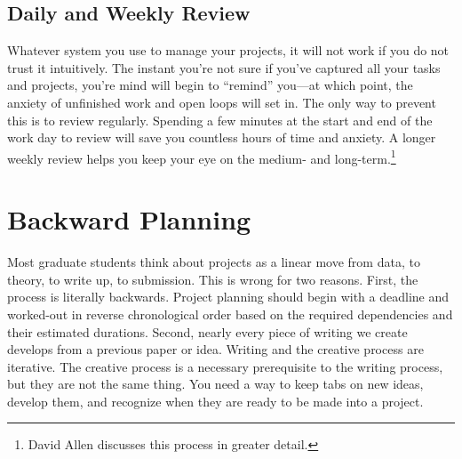 \documentclass{tufte-handout}
\begin{document}
\subsection{Daily and Weekly Review}
\label{sec:review}

Whatever system you use to manage your projects, it will not work if
you do not trust it intuitively. The instant you're not sure if you've
captured all your tasks and projects, you're mind will begin to
``remind'' you---at which point, the anxiety of unfinished work and
open loops will set in. The only way to prevent this is to review
regularly. Spending a few minutes at the start and end of the work day
to review will save you countless hours of time and anxiety. A longer
weekly review helps you keep your eye on the medium- and
long-term.\footnote{David Allen discusses this process in greater
  detail.}



\section{Backward Planning} %
\label{sec:backward_planning}

Most graduate students think about projects as a linear move from data, to theory, to write up, to submission. This is wrong for two reasons. First, the process is literally backwards. Project planning should begin with a deadline and worked-out in reverse chronological order based on the required dependencies and their estimated durations. Second, nearly every piece of writing we create develops from a previous paper or idea. Writing and the creative process are iterative. The creative process is a necessary prerequisite to the writing process, but they are not the same thing. You need a way to keep tabs on new ideas, develop them, and recognize when they are ready to be made into a project.



\end{document}
